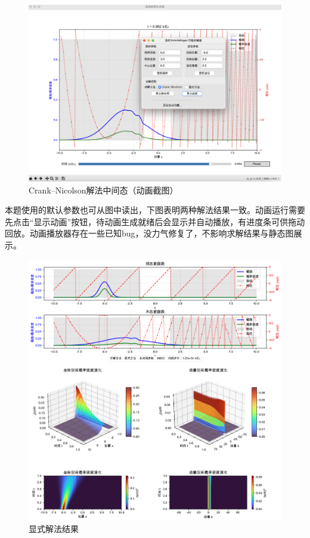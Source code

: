 \begin{figure}[H]
    \centering
    \includegraphics[width=1.0\textwidth]{Problem_2/figs/cn_anim.png}
    \caption{Crank–Nicolson解法中间态（动画截图）}
\end{figure}
本题使用的默认参数也可从图中读出，下图表明两种解法结果一致。动画运行需要先点击“显示动画”按钮，待动画生成就绪后会显示并自动播放，有进度条可供拖动回放。动画播放器存在一些已知bug，没力气修复了，不影响求解结果与静态图展示。
\begin{figure}[H]
    \centering
    \includegraphics[width=1.0\textwidth]{Problem_2/figs/ex_result.png}
    \caption{显式解法结果}
\end{figure}
